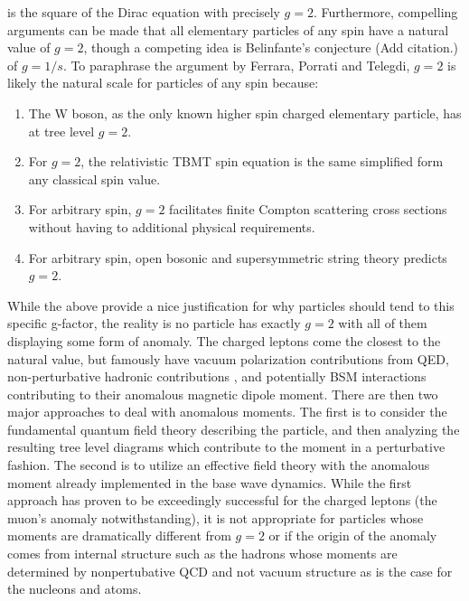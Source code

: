  is the square of the Dirac equation with precisely $g=2$. Furthermore, compelling arguments can be made that all elementary particles \cite{Holstein:2006wi,Holstein:2006ry,Ferrara:1992yc,Herbert:2002} of any spin have a natural value of $g=2$, though a competing idea is Belinfante's conjecture {\color{red}(Add citation.)} of $g=1/s$. To paraphrase the argument by Ferrara, Porrati and Telegdi, $g=2$ is likely the natural scale for particles of any spin because:
\begin{enumerate}
	\item The W boson, as the only known higher spin charged elementary particle, has at tree level $g=2$.
	\item For $g=2$, the relativistic TBMT spin equation is the same simplified form any classical spin value.
	\item For arbitrary spin, $g=2$ facilitates finite Compton scattering cross sections without having to additional physical requirements.
	\item For arbitrary spin, open bosonic and supersymmetric string theory predicts $g=2$.
\end{enumerate}
While the above provide a nice justification for why particles should tend to this specific g-factor, the reality is no particle has exactly $g=2$ with all of them displaying some form of anomaly. The charged leptons come the closest to the natural value, but famously have vacuum polarization contributions \cite{Schwinger:1951nm} from QED, non-perturbative hadronic contributions \cite{Jegerlehner:2001wq,Jegerlehner:2017gek}, and potentially BSM interactions \cite{Czarnecki:2001pv,Knecht:2004,Jegerlehner:2009ry} contributing to their anomalous magnetic dipole moment. There are then two major approaches to deal with anomalous moments. The first is to consider the fundamental quantum field theory describing the particle, and then analyzing the resulting tree level diagrams which contribute to the moment in a perturbative fashion. The second is to utilize an effective field theory with the anomalous moment already implemented in the base wave dynamics. While the first approach has proven to be exceedingly successful for the charged leptons (the muon's anomaly notwithstanding), it is not appropriate for particles whose moments are dramatically different from $g=2$ or if the origin of the anomaly comes from internal structure such as the hadrons whose moments are determined by nonpertubative QCD \cite{Eichmann:2016yit,Pacetti:2014jai} and not vacuum structure as is the case for the nucleons and atoms.

